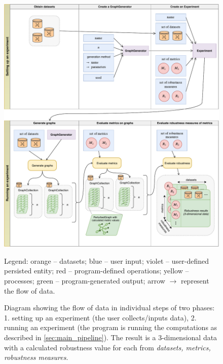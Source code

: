 \begin{figure}
    \includegraphics[width=\linewidth]{main_data_flow.pdf}
    \caption{Diagram showing the flow of data in individual steps of two phases: 1. setting up an experiment (the user collects/inputs data), 2. running an experiment (the program is running the computations as described in \autoref{sec:main_pipeline}). The result is a 3-dimensional data with a calculated robustness value for each from \textsl{datasets, metrics, robustness measures}.}\label{fig:main_data_flow}
    \begin{flushleft}\footnotesize
    Legend: \textcolor{diag-orange}{orange} -- datasets; \textcolor{diag-blue}{blue} -- user input; \textcolor{diag-violet}{violet} -- user-defined persisted entity; \textcolor{diag-red}{red} -- program-defined operations; \textcolor{diag-yellow}{yellow} -- processes; \textcolor{diag-green}{green} -- program-generated output; arrow $\rightarrow$ represent the flow of data.
    \end{flushleft}
\end{figure}
